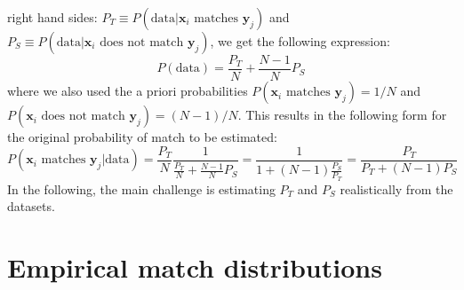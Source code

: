 \documentclass[a4paper]{article}
\renewcommand{\vec}[1]{\mathbf{#1}}
\begin{document}
		right hand sides: $P_T \equiv P( \textrm{data} | \vec{x}_i \textrm{ matches } \vec{y}_j )$ and $P_S \equiv P( \textrm{data} | \vec{x}_i %
		\textrm{ does not match } \vec{y}_j )$, we get the following expression:
		\begin{equation}
			P( \textrm{data} ) = \frac{P_T}{N} + \frac{N-1}{N}P_S
		\end{equation}
		where we also used the a priori probabilities $P( \vec{x}_i \textrm{ matches } \vec{y}_j ) = 1/N$ and $P( \vec{x}_i \textrm{ does not match } %
		\vec{y}_j ) = (N-1)/N$. This results in the following form for the original probability of match to be estimated:
		\begin{equation}
			P( \vec{x}_i \textrm{ matches } \vec{y}_j | \textrm{data} ) = \frac{P_T}{N} \frac{1}{ \frac{P_T}{N} + \frac{N-1}{N}P_S } =
				\frac{1}{1 + (N-1)\frac{P_S}{P_T}} = \frac{P_T}{P_T + (N-1)P_S}
			\label{mainestimate}
		\end{equation}
		In the following, the main challenge is estimating $P_T$ and $P_S$ realistically from the datasets.
	
	\section{Empirical match distributions}
		
\end{document}
